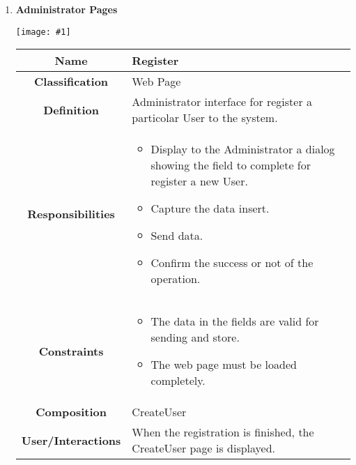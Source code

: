 \documentclass[11pt, a4paper,titlepage]{article}
\newcommand{\image}[1]{
	\begin{center}
		\noindent \texttt{[image: \#1]}
	\end{center}
	}
\begin{document}
\begin{enumerate}
\newpage
\item \textbf{Administrator Pages}\\
\image{page_administrator.png}
\begin{tabularx}{\textwidth}{| c | X |}
	\hline
	\textbf{Name} & 
	Register
	\\
	\hline
	\textbf{Classification} & 
	Web Page
	\\
	\hline
	\textbf{Definition} & 
	Administrator interface for register a  particolar User to the system.\\
	\hline
	\textbf{Responsibilities} &
	\begin{itemize}
		\item Display to the Administrator a dialog showing the field to             complete for register a new User.
		\item  Capture the data insert.
		\item Send data.
		\item Confirm the success or not of the operation.
	\end{itemize}
	\\
	\hline
	\textbf{Constraints} & 
	\begin{itemize}
		\item  The data in the fields are valid for sending and store.
		\item The web page must be loaded completely.
	\end{itemize}
	\\
	\hline
	\textbf{Composition} & 
	CreateUser
	\\
	\hline
	\textbf{User/Interactions} & 
	When the registration is finished, the CreateUser page is displayed.
	\\
	\hline	
\end{tabularx}


\end{enumerate}
\end{document}
